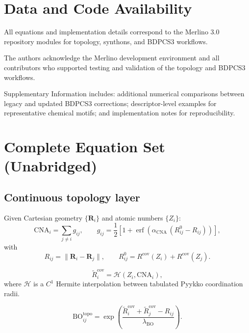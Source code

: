 \documentclass[journal=jctcce,manuscript=article]{achemso}
\begin{document}
\section*{Data and Code Availability}
All equations and implementation details correspond to the Merlino 3.0 repository modules for topology, synthons, and BDPCS3 workflows.

\begin{acknowledgement}
The authors acknowledge the Merlino development environment and all contributors who supported testing and validation of the topology and BDPCS3 workflows.
\end{acknowledgement}

\begin{suppinfo}
Supplementary Information includes: additional numerical comparisons between legacy and updated BDPCS3 corrections; descriptor-level examples for representative chemical motifs; and implementation notes for reproducibility.
\end{suppinfo}

\appendix
\section{Complete Equation Set (Unabridged)}

\subsection{Continuous topology layer}
Given Cartesian geometry $\{\mathbf{R}_i\}$ and atomic numbers $\{Z_i\}$:
\begin{equation}
\mathrm{CNA}_i = \sum_{j\neq i} g_{ij},
\qquad
g_{ij} = \frac{1}{2}\left[1+\operatorname{erf}\!\left(\alpha_{\mathrm{CNA}}\,(R^0_{ij}-R_{ij})\right)\right],
\end{equation}
with
\begin{equation}
R_{ij}=\lVert \mathbf{R}_i-\mathbf{R}_j\rVert,
\qquad
R^0_{ij}=R^{\mathrm{cov}}(Z_i)+R^{\mathrm{cov}}(Z_j).
\end{equation}

\begin{equation}
\tilde R^{\mathrm{cov}}_i = \mathcal{H}\!\left(Z_i,\mathrm{CNA}_i\right),
\end{equation}
where $\mathcal{H}$ is a $C^1$ Hermite interpolation between tabulated Pyykko coordination radii.

\begin{equation}
\mathrm{BO}_{ij}^{\mathrm{topo}}
=\exp\!\left(
\frac{\tilde R^{\mathrm{cov}}_i+\tilde R^{\mathrm{cov}}_j-R_{ij}}{\lambda_{\mathrm{BO}}}
\right).
\end{equation}
\end{document}
